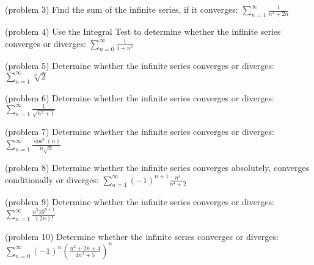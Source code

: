 \documentclass[handout]{ximera}
\begin{document}
\begin{problem}(problem 3)
Find the sum of the infinite series, if it converges: $\displaystyle \sum_{n=1}^\infty \frac{1}{n^2 + 2n}$

\end{problem}

\begin{problem}(problem 4)
Use the Integral Test to determine whether the infinite series converges or diverges:  $\displaystyle \sum_{n=0}^\infty \frac{1}{1+n^2}$

\end{problem}

\begin{problem}(problem 5)
Determine whether the infinite series converges or diverges: $\displaystyle \sum_{n=1}^\infty \sqrt[n] 2$

\end{problem}


\begin{problem}(problem 6)
Determine whether the infinite series converges or diverges: $\displaystyle \sum_{n=1}^\infty \frac{1}{\sqrt{n^2 + 1}}$

\end{problem}

\begin{problem}(problem 7)
Determine whether the infinite series converges or diverges: $\displaystyle \sum_{n=1}^\infty \frac{\cos^4(n)}{n\sqrt{n}}$

\end{problem}

\begin{problem}(problem 8)
Determine whether the infinite series converges absolutely, converges conditionally or diverges: $\displaystyle \sum_{n=1}^\infty (-1)^{n+1} \frac{n^3}{n^4 + 2}$

\end{problem}

\begin{problem}(problem 9)
Determine whether the infinite series converges or diverges: $\displaystyle \sum_{n=1}^\infty \frac{n^5 10^{n+1}}{(2n)!}$

\end{problem}


\begin{problem}(problem 10)
Determine whether the infinite series converges or diverges: $\displaystyle \sum_{n=0}^\infty (-1)^n\left(\frac{n^2 + 2n+ 4}{4n^2 + 5}\right)^n$

\end{problem}
\end{document}
